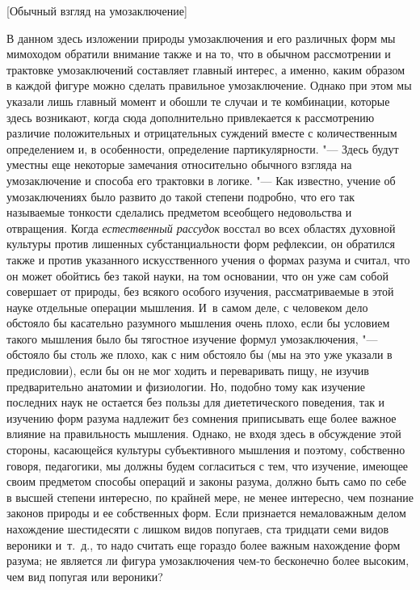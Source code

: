 %
{[Обычный взгляд на умозаключение]}

В данном здесь изложении природы умозаключения и его различных
форм мы мимоходом обратили внимание также и на то, что в обычном
рассмотрении и трактовке умозаключений составляет главный
интерес, а именно, каким образом в каждой фигуре можно сделать правильное
умозаключение. Однако при этом мы указали лишь главный момент и обошли те
случаи и те комбинации, которые здесь возникают, когда сюда дополнительно
привлекается к рассмотрению различие положительных и отрицательных суждений
вместе с количественным определением и, в особенности, определение
партикулярности. "--- Здесь будут уместны еще некоторые
замечания относительно обычного взгляда на умозаключение и способа его
трактовки в логике. "--- Как известно, учение об умозаключениях
было развито до такой степени подробно, что его так называемые тонкости
сделались предметом всеобщего недовольства и отвращения. Когда
{\em естественный рассудок}
восстал во всех областях духовной культуры против лишенных
субстанциальности форм рефлексии, он обратился также и против указанного
искусственного учения о формах разума и считал, что он может обойтись без
такой науки, на том основании, что он уже сам собой совершает от природы,
без всякого особого изучения, рассматриваемые в этой науке отдельные
операции мышления. И~в самом деле, с человеком дело обстояло бы касательно
разумного мышления очень плохо, если бы условием такого мышления было бы
тягостное изучение формул умозаключения, "--- обстояло бы столь
же плохо, как с ним обстояло бы (мы на это уже указали в
предисловии),
если бы он не мог ходить и переваривать пищу, не изучив
предварительно анатомии и физиологии. Но, подобно тому как изучение
последних наук не остается без пользы для диететического поведения, так и
изучению форм разума надлежит без сомнения приписывать еще более важное
влияние на правильность мышления. Однако, не входя здесь в обсуждение этой
стороны, касающейся культуры субъективного мышления и поэтому, собственно
говоря, педагогики, мы должны будем согласиться с тем, что изучение,
имеющее своим предметом способы операций и законы разума, должно быть само
по себе в высшей степени интересно, по крайней мере, не менее интересно,
чем познание законов природы и ее собственных форм. Если признается
немаловажным делом нахождение шестидесяти с лишком видов попугаев, ста
тридцати семи видов вероники и~т.~д., то надо считать еще гораздо более
важным нахождение форм разума; не является ли фигура умозаключения чем-то
бесконечно более высоким, чем вид попугая или вероники?

